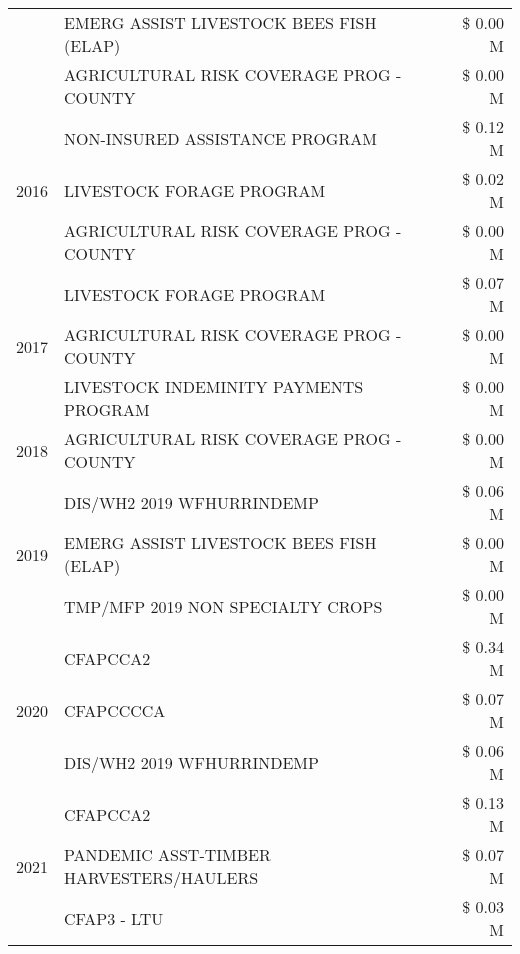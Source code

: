 \begin{tabular}{llr}
 & EMERG ASSIST LIVESTOCK BEES FISH (ELAP) & \$ 0.00 M \\
 & AGRICULTURAL RISK COVERAGE PROG - COUNTY & \$ 0.00 M \\
\cline{1-3}
\multirow[t]{3}{*}{2016} & NON-INSURED ASSISTANCE PROGRAM & \$ 0.12 M \\
 & LIVESTOCK FORAGE PROGRAM & \$ 0.02 M \\
 & AGRICULTURAL RISK COVERAGE PROG - COUNTY & \$ 0.00 M \\
\cline{1-3}
\multirow[t]{3}{*}{2017} & LIVESTOCK FORAGE PROGRAM & \$ 0.07 M \\
 & AGRICULTURAL RISK COVERAGE PROG - COUNTY & \$ 0.00 M \\
 & LIVESTOCK INDEMINITY PAYMENTS PROGRAM & \$ 0.00 M \\
\cline{1-3}
2018 & AGRICULTURAL RISK COVERAGE PROG - COUNTY & \$ 0.00 M \\
\cline{1-3}
\multirow[t]{3}{*}{2019} & DIS/WH2 2019 WFHURRINDEMP & \$ 0.06 M \\
 & EMERG ASSIST LIVESTOCK BEES FISH (ELAP) & \$ 0.00 M \\
 & TMP/MFP 2019 NON SPECIALTY CROPS & \$ 0.00 M \\
\cline{1-3}
\multirow[t]{3}{*}{2020} & CFAPCCA2 & \$ 0.34 M \\
 & CFAPCCCCA & \$ 0.07 M \\
 & DIS/WH2 2019 WFHURRINDEMP & \$ 0.06 M \\
\cline{1-3}
\multirow[t]{3}{*}{2021} & CFAPCCA2 & \$ 0.13 M \\
 & PANDEMIC ASST-TIMBER HARVESTERS/HAULERS & \$ 0.07 M \\
 & CFAP3 - LTU & \$ 0.03 M \\
\cline{1-3}
\bottomrule
\end{tabular}
